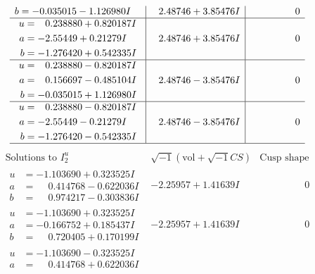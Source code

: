 \documentclass[1p]{elsarticle_modified}
\theoremstyle{definition}
\newcommand{\I}{\sqrt{-1}}
\begin{document}
$$\begin{array}{c|c|c}
\begin{aligned}
b &= -0.035015 - 1.126980 I\end{aligned}
 & \phantom{-}2.48746 + 3.85476 I & \phantom{-0.000000 } 0 \\ \hline\begin{aligned}
u &= \phantom{-}0.238880 + 0.820187 I \\
a &= -2.55449 + 0.21279 I \\
b &= -1.276420 + 0.542335 I\end{aligned}
 & \phantom{-}2.48746 + 3.85476 I & \phantom{-0.000000 } 0 \\ \hline\begin{aligned}
u &= \phantom{-}0.238880 - 0.820187 I \\
a &= \phantom{-}0.156697 - 0.485104 I \\
b &= -0.035015 + 1.126980 I\end{aligned}
 & \phantom{-}2.48746 - 3.85476 I & \phantom{-0.000000 } 0 \\ \hline\begin{aligned}
u &= \phantom{-}0.238880 - 0.820187 I \\
a &= -2.55449 - 0.21279 I \\
b &= -1.276420 - 0.542335 I\end{aligned}
 & \phantom{-}2.48746 - 3.85476 I & \phantom{-0.000000 } 0\\
 \hline 
 \end{array}$$\newpage$$\begin{array}{c|c|c}  
\text{Solutions to }I^u_{2}& \I (\text{vol} + \sqrt{-1}CS) & \text{Cusp shape}\\
 \hline 
\begin{aligned}
u &= -1.103690 + 0.323525 I \\
a &= \phantom{-}0.414768 - 0.622036 I \\
b &= \phantom{-}0.974217 - 0.303836 I\end{aligned}
 & -2.25957 + 1.41639 I & \phantom{-0.000000 } 0 \\ \hline\begin{aligned}
u &= -1.103690 + 0.323525 I \\
a &= -0.166752 + 0.185437 I \\
b &= \phantom{-}0.720405 + 0.170199 I\end{aligned}
 & -2.25957 + 1.41639 I & \phantom{-0.000000 } 0 \\ \hline\begin{aligned}
u &= -1.103690 - 0.323525 I \\
a &= \phantom{-}0.414768 + 0.622036 I \\

\end{aligned}
\end{array}$$
\end{document}
